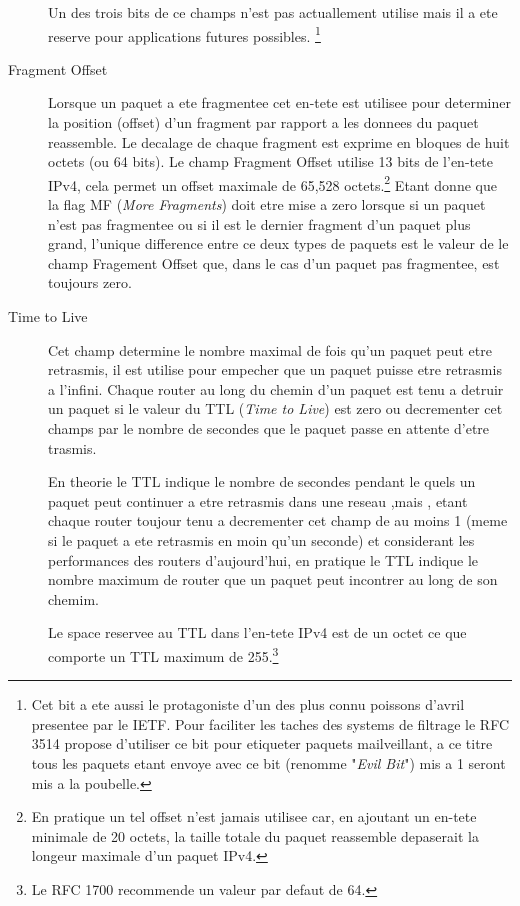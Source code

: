 \begin{description}
Un des trois bits de ce champs n'est pas actuallement utilise mais il a ete
reserve pour applications futures possibles.
\footnote {Cet bit a ete aussi le protagoniste d'un des plus connu poissons
d'avril presentee par le IETF. Pour faciliter les taches des systems de filtrage 
le RFC 3514 propose d'utiliser ce bit pour etiqueter paquets mailveillant, a ce
titre tous les paquets etant envoye avec ce bit (renomme "{\it Evil Bit}") 
mis a 1 seront mis a la poubelle.
}

\item [Fragment Offset]
Lorsque un paquet a ete fragmentee cet en-tete est utilisee pour determiner la 
position (offset) d'un fragment par rapport a les donnees du paquet reassemble.
Le decalage de chaque fragment est exprime en bloques de huit octets (ou 64
bits).  Le champ Fragment Offset utilise 13 bits de l'en-tete IPv4, cela permet
un offset maximale de 65,528 octets.\footnote {En pratique un tel offset n'est
jamais utilisee car, en ajoutant un en-tete minimale de 20 octets, la taille 
totale du paquet reassemble depaserait la longeur maximale d'un paquet IPv4.}
Etant donne que la flag MF ({\it More Fragments}) doit etre mise a zero lorsque 
si un paquet n'est pas fragmentee ou si il est le dernier fragment d'un paquet
plus grand, l'unique difference entre ce deux types de paquets est le valeur
de le champ Fragement Offset que, dans le cas d'un paquet pas fragmentee, est
toujours zero.

\item [Time to Live]
Cet champ determine le nombre maximal de fois qu'un paquet peut etre retrasmis, 
il est utilise pour empecher que un paquet puisse etre retrasmis a l'infini.
Chaque router au long du chemin d'un paquet est tenu a detruir un paquet si le
valeur du TTL ({\it Time to Live}) est zero ou decrementer cet champs par le
nombre de secondes que le paquet passe en attente d'etre trasmis.

En theorie le TTL indique le nombre de secondes pendant le quels un paquet
peut continuer a etre retrasmis dans une reseau ,mais , etant chaque router
toujour tenu a decrementer cet champ de au moins 1 (meme si le paquet a ete
retrasmis en moin qu'un seconde) et considerant les performances des routers
d'aujourd'hui, en pratique le TTL indique le nombre maximum de router que
un paquet peut incontrer au long de son chemim.

Le space reservee au TTL dans l'en-tete IPv4 est de un octet ce que comporte un 
TTL maximum de 255.\footnote {Le RFC 1700 recommende un valeur par defaut de 64.}


\end{description}
